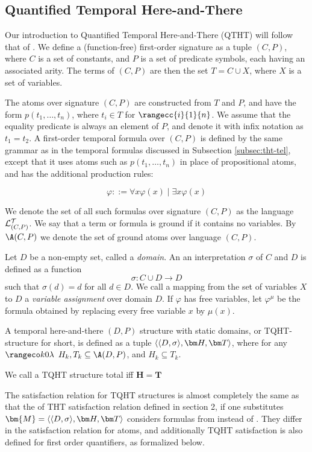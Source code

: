 \subsection{Quantified Temporal Here-and-There}

Our introduction to Quantified Temporal Here-and-There (QTHT) will
follow that of \cite{agcapevidi17a}. We define a (function-free)
first-order signature as a tuple $(C,P)$, where $C$ is a set of
constants, and $P$ is a set of predicate symbols, each having an
associated arity. The terms of $(C,P)$ are then the set
$T = C \cup X$, where $X$ is a set of variables.

The atoms over signature $(C,P)$ are constructed from $T$ and $P$, and
have the form $p(t_1,\dots,t_n)$, where $t_i \in T$ for
$\rangecc{i}{1}{n}$. We assume that the equality predicate is always
an element of $P$, and denote it with infix notation as $t_1=t_2$. A
first-order temporal formula over $(C,P)$ is defined by the same
grammar as in the temporal formulas discussed in Subsection
\ref{subsec:tht-tel}, except that it uses atoms such as
$p(t_1, \dots, t_n)$ in place of propositional atoms, and has the
additional production rules:

$$
\varphi ::= \forall x \varphi(x) \mid \exists x \varphi(x)
$$

We denote the set of all such formulas over signature $(C,P)$ as the
language $\mathcal{L}_{(C,P)}^\mathcal{T}$. We say that a term or formula is ground if it
contains no variables. By $\A(C,P)$ we denote the set of ground atoms
over language $(C,P)$.

Let $D$ be a non-empty set, called a \emph{domain}. An an
interpretation $\sigma$ of $C$ and $D$ is defined as a function
$$
\sigma: C \cup D \rightarrow D
$$
such that $\sigma(d) = d$ for all $d \in D$. We call a mapping from
the set of variables $X$ to $D$ a \textit{variable assignment} over
domain $D$. If $\varphi$ has free variables, let $\varphi^\mu$ be the
formula obtained by replacing every free variable $x$ by $\mu(x)$.

\begin{definition}
  A temporal here-and-there $(D,P)$ structure with static domains, or
  TQHT-structure for short, is defined as a tuple $\qthandt$, where
  for any $\kinlambda$ $H_k,T_k \subseteq \A(D,P)$, and
  $H_k \subseteq T_k$.

  We call a TQHT structure total iff $\bm{H}=\bm{T}$
\end{definition}


The satisfaction relation for TQHT structures is almost completely the
same as that the of THT satisfaction relation defined in section 2, if
one substitutes $\bm{M}=\qthandt$ considers formulas from \langcdpt
instead of \langat. They differ in the satisfaction relation for
atoms, and additionally TQHT satisfaction is also defined for first
order quantifiers, as formalized below.

